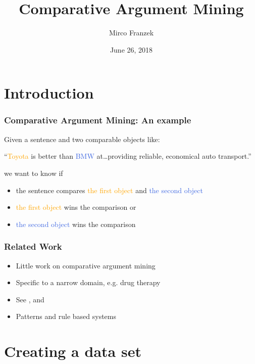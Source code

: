 \documentclass[11pt,aspectratio=169,usenames,dvipsnames]{beamer}
\title{Comparative Argument Mining}
\author{Mirco Franzek}
\date{June 26, 2018}
\begin{document}
    \maketitle

    \section{Introduction}
    \frame{\sectionpage}

    \begin{frame}[t]
        \frametitle{Comparative Argument Mining: An example}
        Given a sentence and two comparable objects like:

        \begin{center}
            \LARGE \enquote{\textcolor{orange}{Toyota} is better than \textcolor{RoyalBlue}{BMW} at\ldots providing reliable, economical auto transport.}
        \end{center}
        \pause
        we want to know if
        \begin{itemize}
            \item the sentence compares \textcolor{orange}{the first object} and \textcolor{RoyalBlue}{the second object}   \pause
            \item \textcolor{orange}{the first object} wins the comparison or   \pause
            \item \textcolor{RoyalBlue}{the second object} wins the comparison
        \end{itemize}

    \end{frame}

    \begin{frame}[t]
        \frametitle{Related Work}
        \begin{itemize}
            \item Little work on comparative argument mining
            \item Specific to a narrow domain, e.g. drug therapy
            \item See \cite{fiszman2007interpreting}, \cite{Park:2012:ICC:2391171.2391173} and \cite{gupta2017identifying}
            \item Patterns and rule based systems
        \end{itemize}

    \end{frame}


    \section{Creating a data set}
    \frame{\sectionpage}
\end{document}
